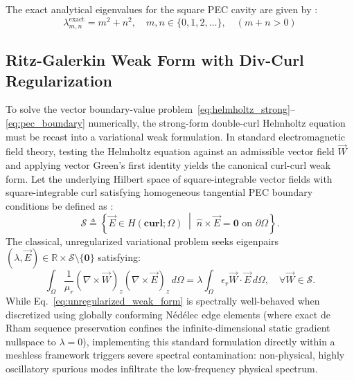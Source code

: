 \documentclass[preprint,12pt]{elsarticle}
\begin{document}
The exact analytical eigenvalues for the square PEC cavity are given by \cite{harrington2001time}:
\begin{equation}
    \lambda_{m,n}^{\mathrm{exact}} = m^2 + n^2, \quad m,n \in \{0, 1, 2, \dots\}, \quad (m+n > 0)
    \label{eq:analytical_eigenvalues}
\end{equation}

\subsection{Ritz-Galerkin Weak Form with Div-Curl Regularization}
\label{subsec:weak_form_regularization}

To solve the vector boundary-value problem~\eqref{eq:helmholtz_strong}--\eqref{eq:pec_boundary} numerically, the strong-form double-curl Helmholtz equation must be recast into a variational weak formulation. In standard electromagnetic field theory, testing the Helmholtz equation against an admissible vector field $\vec{W}$ and applying vector Green's first identity yields the canonical curl-curl weak form. Let the underlying Hilbert space of square-integrable vector fields with square-integrable curl satisfying homogeneous tangential PEC boundary conditions be defined as \cite{monk2003finite, bossavit1998computational, boffi2013mixed}:
\begin{equation}
    \mathcal{S} \triangleq \left\{ \vec{E} \in H(\mathbf{curl}; \Omega) \;\middle|\; \hat{n} \times \vec{E} = \mathbf{0} \text{ on } \partial\Omega \right\}.
    \label{eq:hilbert_space_S}
\end{equation}
The classical, unregularized variational problem seeks eigenpairs $(\lambda, \vec{E}) \in \mathbb{R} \times \mathcal{S} \setminus \{\mathbf{0}\}$ satisfying:
\begin{equation}
    \int_{\Omega} \frac{1}{\mu_r} (\nabla \times \vec{W})_z (\nabla \times \vec{E})_z \, d\Omega = \lambda \int_{\Omega} \epsilon_r \vec{W} \cdot \vec{E} \, d\Omega, \quad \forall \vec{W} \in \mathcal{S}.
    \label{eq:unregularized_weak_form}
\end{equation}
While Eq.~\eqref{eq:unregularized_weak_form} is spectrally well-behaved when discretized using globally conforming N\'ed\'elec edge elements (where exact de Rham sequence preservation confines the infinite-dimensional static gradient nullspace to $\lambda = 0$), implementing this standard formulation directly within a meshless framework triggers severe spectral contamination: non-physical, highly oscillatory spurious modes infiltrate the low-frequency physical spectrum.
\end{document}
